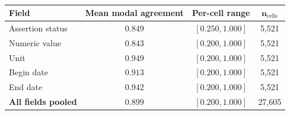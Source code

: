 \begin{table}[h]
\centering
\caption{}
\label{supp:consistency-field-stability}
\small
\begin{tabular}{lccc}
\hline
\textbf{Field} & \textbf{Mean modal agreement} & \textbf{Per-cell range} & $\boldsymbol{n_{\mathrm{cells}}}$ \\
\hline
Assertion status   & $0.849$ & $[0.250, 1.000]$ & 5,521 \\
Numeric value      & $0.843$ & $[0.200, 1.000]$ & 5,521 \\
Unit               & $0.949$ & $[0.200, 1.000]$ & 5,521 \\
Begin date         & $0.913$ & $[0.200, 1.000]$ & 5,521 \\
End date           & $0.942$ & $[0.200, 1.000]$ & 5,521 \\
\hline
\textbf{All fields pooled} & $\mathbf{0.899}$ & $[0.200, 1.000]$ & 27,605 \\
\hline
\end{tabular}
\end{table}

